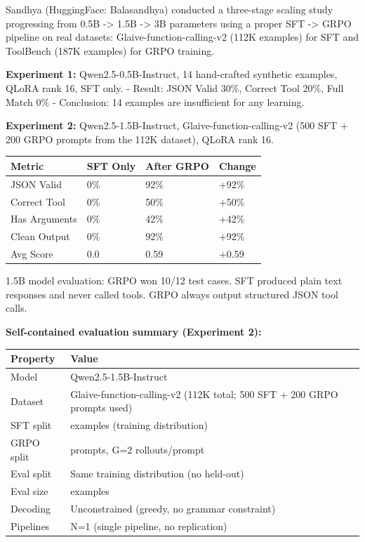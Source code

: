 \documentclass[
  american,
  11pt,
  a4paper,
  oneside]{report}
\newcounter{none} %
\begin{document}
Sandhya (HuggingFace: Balasandhya) conducted a three-stage scaling study
progressing from 0.5B -\textgreater{} 1.5B -\textgreater{} 3B parameters
using a proper SFT -\textgreater{} GRPO pipeline on real datasets:
Glaive-function-calling-v2 (112K examples) for SFT and ToolBench (187K
examples) for GRPO training.

\textbf{Experiment 1:} Qwen2.5-0.5B-Instruct, 14 hand-crafted synthetic
examples, QLoRA rank 16, SFT only. - Result: JSON Valid 30\%, Correct
Tool 20\%, Full Match 0\% - Conclusion: 14 examples are insufficient for
any learning.

\textbf{Experiment 2:} Qwen2.5-1.5B-Instruct, Glaive-function-calling-v2
(500 SFT + 200 GRPO prompts from the 112K dataset), QLoRA rank 16.

{\def\LTcaptype{none} %
\begin{longtable}[]{@{}llll@{}}
\toprule\noalign{}
Metric & SFT Only & After GRPO & Change \\
\midrule\noalign{}
\endhead
\bottomrule\noalign{}
\endlastfoot
JSON Valid & 0\% & 92\% & +92\% \\
Correct Tool & 0\% & 50\% & +50\% \\
Has Arguments & 0\% & 42\% & +42\% \\
Clean Output & 0\% & 92\% & +92\% \\
Avg Score & 0.0 & 0.59 & +0.59 \\
\end{longtable}
}

1.5B model evaluation: GRPO won 10/12 test cases. SFT produced plain
text responses and never called tools. GRPO always output structured
JSON tool calls.

\textbf{Self-contained evaluation summary (Experiment 2):}

{\def\LTcaptype{none} %
\begin{longtable}[]{@{}
  >{\raggedright\arraybackslash}p{}
  >{\raggedright\arraybackslash}p{}@{}}
\toprule\noalign{}
\begin{minipage}[b]{\linewidth}\raggedright
Property
\end{minipage} & \begin{minipage}[b]{\linewidth}\raggedright
Value
\end{minipage} \\
\midrule\noalign{}
\endhead
\bottomrule\noalign{}
\endlastfoot
Model & Qwen2.5-1.5B-Instruct \\
Dataset & Glaive-function-calling-v2 (112K total; 500 SFT + 200 GRPO
prompts used) \\
SFT split & 500 examples (training distribution) \\
GRPO split & 200 prompts, G=2 rollouts/prompt \\
Eval split & Same training distribution (no held-out) \\
Eval size & 50 examples \\
Decoding & Unconstrained (greedy, no grammar constraint) \\
Pipelines & N=1 (single pipeline, no replication) \\
\end{longtable}
}
\end{document}
